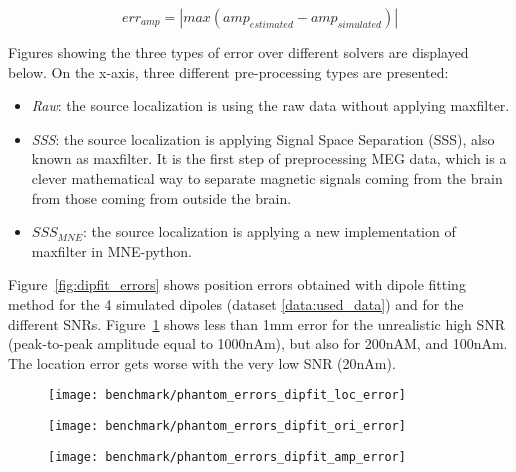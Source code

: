 \begin{equation}\label{eq:amp_err}
err_{amp} = |max(amp_{estimated} - amp_{simulated})|
\end{equation}

Figures showing the three types of error over different solvers are displayed below. On the x-axis, three different pre-processing types are presented:
\begin{itemize}
\item \textit{Raw}: the source localization is using the raw data without applying maxfilter.
\item \textit{SSS}: the source localization is applying Signal Space Separation (SSS), also known as maxfilter. It is the first step of preprocessing MEG data, which is a clever mathematical way to separate magnetic signals coming from the brain from those coming from outside the brain.
\item \textit{$SSS_{MNE}$}: the source localization is applying a new implementation of maxfilter in MNE-python.
\end{itemize}

Figure~\ref{fig:dipfit_errors} shows position errors obtained with dipole fitting method for the 4 simulated dipoles (dataset \ref{data:used_data}) and for the different SNRs. Figure~\ref{fig:dipfit_pos} shows less than 1mm error for the unrealistic high SNR (peak-to-peak amplitude equal to 1000nAm), but also for 200nAM, and 100nAm. The location error gets worse with the very low SNR (20nAm).

\begin{sidewaysfigure}[ht]
        \centering
        \begin{subfigure}[b]{0.28\textwidth}
            \centering
            \texttt{[image: benchmark/phantom\_errors\_dipfit\_loc\_error]}
            \caption{\label{fig:dipfit_pos}}
        \end{subfigure}
		\hspace{35pt}
        \begin{subfigure}[b]{0.28\textwidth}  
            \centering 
            \texttt{[image: benchmark/phantom\_errors\_dipfit\_ori\_error]}
            \caption{\label{fig:dipfit_ori}}
        \end{subfigure}
		\hspace{35pt}
        \begin{subfigure}[b]{0.28\textwidth}   
            \centering 
            \texttt{[image: benchmark/phantom\_errors\_dipfit\_amp\_error]}
            \caption{\label{fig:dipfit_amp}}
        \end{subfigure}

		\caption{The dipole fit errors on localization (mm), orientation (Rad), and amplitude (nAm) using 4 dipoles (5-8) having different depth in the phantom.\label{fig:dipfit_errors}}
\end{sidewaysfigure}

